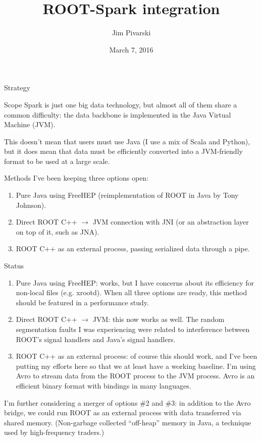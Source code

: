 \documentclass{beamer}
\title[2016-03-07-spark]{ROOT-Spark integration}
\author{Jim Pivarski}
\institute{Princeton Univeristy --- DIANA}
\date{March 7, 2016}
\begin{document}
\begin{frame}
  \titlepage
\end{frame}


\begin{frame}{Strategy}
\begin{block}{Scope}
Spark is just one big data technology, but almost all of them share a common difficulty: the data backbone is implemented in the Java Virtual Machine (JVM).

\vspace{0.2 cm}
This doesn't mean that users must use Java (I use a mix of Scala and Python), but it does mean that data must be efficiently converted into a JVM-friendly format to be used at a large scale.
\end{block}

\begin{block}{Methods}
I've been keeping three options open:
\begin{enumerate}
\item Pure Java using FreeHEP (reimplementation of ROOT in Java by Tony Johnson).
\item Direct ROOT C++ $\to$ JVM connection with JNI (or an abstraction layer on top of it, such as JNA).
\item ROOT C++ as an external process, passing serialized data through a pipe.
\end{enumerate}
\end{block}
\end{frame}

\begin{frame}{Status}
\begin{enumerate}
\item Pure Java using FreeHEP: works, but I have concerns about its efficiency for non-local files (e.g. xrootd). When all three options are ready, this method should be featured in a performance study.

\item Direct ROOT C++ $\to$ JVM: this now works as well. The random segmentation faults I was experiencing were related to interference between ROOT's signal handlers and Java's signal handlers.

\item ROOT C++ as an external process: of course this should work, and I've been putting my efforts here so that we at least have a working baseline. I'm using Avro to stream data from the ROOT process to the JVM process. Avro is an efficient binary format with bindings in many languages.
\end{enumerate}

I'm further considering a merger of options \#2 and \#3: in addition to the Avro bridge, we could run ROOT as an external process with data transferred via shared memory. (Non-garbage collected ``off-heap'' memory in Java, a technique used by high-frequency traders.)

\end{frame}
\end{document}
